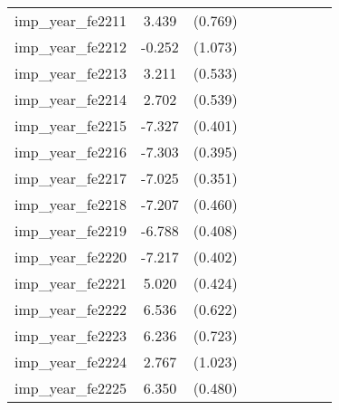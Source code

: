 {\begin{tabular}{l*{4}{cc}}
imp\_year\_fe2211&    3.439\sym{***}&  (0.769)&                  &         &                  &         &                  &         \\
imp\_year\_fe2212&   -0.252         &  (1.073)&                  &         &                  &         &                  &         \\
imp\_year\_fe2213&    3.211\sym{***}&  (0.533)&                  &         &                  &         &                  &         \\
imp\_year\_fe2214&    2.702\sym{***}&  (0.539)&                  &         &                  &         &                  &         \\
imp\_year\_fe2215&   -7.327\sym{***}&  (0.401)&                  &         &                  &         &                  &         \\
imp\_year\_fe2216&   -7.303\sym{***}&  (0.395)&                  &         &                  &         &                  &         \\
imp\_year\_fe2217&   -7.025\sym{***}&  (0.351)&                  &         &                  &         &                  &         \\
imp\_year\_fe2218&   -7.207\sym{***}&  (0.460)&                  &         &                  &         &                  &         \\
imp\_year\_fe2219&   -6.788\sym{***}&  (0.408)&                  &         &                  &         &                  &         \\
imp\_year\_fe2220&   -7.217\sym{***}&  (0.402)&                  &         &                  &         &                  &         \\
imp\_year\_fe2221&    5.020\sym{***}&  (0.424)&                  &         &                  &         &                  &         \\
imp\_year\_fe2222&    6.536\sym{***}&  (0.622)&                  &         &                  &         &                  &         \\
imp\_year\_fe2223&    6.236\sym{***}&  (0.723)&                  &         &                  &         &                  &         \\
imp\_year\_fe2224&    2.767\sym{**} &  (1.023)&                  &         &                  &         &                  &         \\
imp\_year\_fe2225&    6.350\sym{***}&  (0.480)&                  &         &                  &         &                  &         \\

\end{tabular}}
